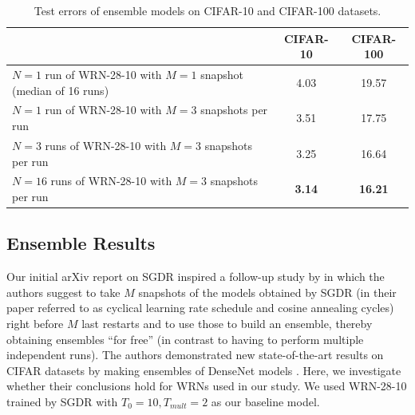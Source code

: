 \documentclass{article}
\begin{document}
\begin{table}[t]
\renewcommand{\arraystretch}{1.2}
\begin{center}
  \begin{tabular}{ l  | c | c }
    \hline
				&  CIFAR-10 & CIFAR-100 \\ \hline
		$N=1$ run of WRN-28-10 with $M=1$ snapshot (median of 16 runs)			& 4.03 & 19.57 \\
		$N=1$ run of WRN-28-10 with $M=3$ snapshots per run  	& 3.51 & 17.75 \\
		$N=3$ runs of WRN-28-10 with $M=3$ snapshots per run  	& 3.25 & 16.64 \\
		$N=16$ runs of WRN-28-10 with $M=3$ snapshots per run  	& \textbf{3.14} & \textbf{16.21} \\
    \hline
  \end{tabular}
\end{center}
\caption{Test errors of ensemble models on CIFAR-10 and CIFAR-100 datasets.}
\end{table}

\subsection{Ensemble Results}
\label{sec:ens}
Our initial arXiv report on SGDR \citep{loshchilov2016sgdr} inspired a follow-up study by \cite{SnapshotICLR2017}  in which the authors suggest to take $M$ snapshots of the models obtained by SGDR (in their paper referred to as cyclical learning rate schedule and cosine annealing cycles) right before $M$ last restarts and to use those to build an ensemble, thereby obtaining ensembles ``for free'' (in contrast to having to perform multiple independent runs). The authors demonstrated new state-of-the-art results on CIFAR datasets by making ensembles of DenseNet models \citep{huang2016densely}. Here, we investigate whether their conclusions hold for WRNs used in our study. We used WRN-28-10 trained by SGDR with $T_0=10, T_{mult}=2$ as our baseline model.
\end{document}
